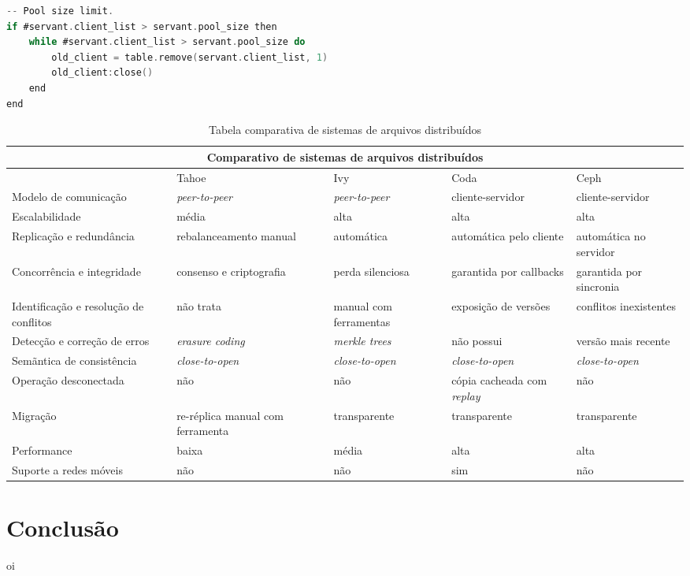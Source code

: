 \documentclass[11pt]{article}
\begin{document}
\begin{lstlisting}[label={connpool},language=C,caption=Connection Pool
em C \textit{PPH} em $O(n^2)$ com \textit{array}]
-- Pool size limit.
if #servant.client_list > servant.pool_size then
    while #servant.client_list > servant.pool_size do
        old_client = table.remove(servant.client_list, 1)
        old_client:close()
    end
end
\end{lstlisting}

\renewcommand{\arraystretch}{2}
\begin{table}
\begin{center}
{\footnotesize \begin{tabular}{p{2.5cm} p{2.5cm} p{2.5cm} p{2.5cm} p{2.5cm}}
\hline
\multicolumn{5}{c}{Comparativo de sistemas de arquivos distribuídos} \\ \hline
~ & Tahoe & Ivy & Coda & Ceph \\ \hline
Modelo de comunicação & \textit{peer-to-peer} & \textit{peer-to-peer} & cliente-servidor & cliente-servidor \\
Escalabilidade & média & alta & alta & alta \\
Replicação e redundância & rebalanceamento manual & automática & automática pelo cliente & automática no servidor \\
Concorrência e integridade & consenso e criptografia & perda silenciosa & garantida por callbacks & garantida por sincronia \\
Identificação e resolução de conflitos & não trata & manual com ferramentas & exposição de versões & conflitos inexistentes \\
Detecção e correção de erros & \textit{erasure coding} & \textit{merkle trees} & não possui & versão mais recente \\
Semãntica de consistência & \textit{close-to-open} & \textit{close-to-open} & \textit{close-to-open} & \textit{close-to-open} \\
Operação desconectada & não & não & cópia cacheada com \textit{replay} & não \\ 
Migração & re-réplica manual com ferramenta & transparente & transparente & transparente \\
Performance & baixa & média & alta & alta \\
Suporte a redes móveis & não & não & sim & não \\
\hline
\end{tabular}}
\caption{Tabela comparativa de sistemas de arquivos distribuídos}
\label{tab:compare}
\end{center}
\end{table}

\section{Conclusão}\label{sec:conclusion}

oi



\end{document}
